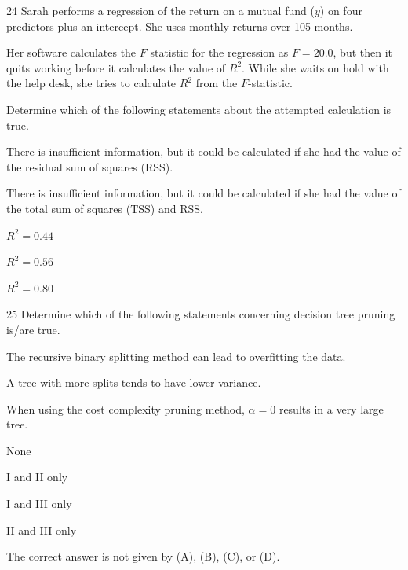 \begin{question}{24}
Sarah performs a regression of the return on a mutual fund ($y$) on four predictors plus an intercept. She uses monthly returns over 105 months.

Her software calculates the $F$ statistic for the regression as $F = 20.0$, but then it quits working before it calculates the value of $R^2$. While she waits on hold with the help desk, she tries to calculate $R^2$ from the $F$-statistic.

Determine which of the following statements about the attempted calculation is true.

\begin{choices}
\item There is insufficient information, but it could be calculated if she had the value of the residual sum of squares (RSS).
\item There is insufficient information, but it could be calculated if she had the value of the total sum of squares (TSS) and RSS.
\item $R^2 = 0.44$
\item $R^2 = 0.56$
\item $R^2 = 0.80$
\end{choices}
\end{question}

\begin{question}{25}
Determine which of the following statements concerning decision tree pruning is/are true.
\begin{statements}
\item The recursive binary splitting method can lead to overfitting the data.
\item A tree with more splits tends to have lower variance.
\item When using the cost complexity pruning method, $\alpha = 0$ results in a very large tree.
\end{statements}

\begin{choices}
\item None
\item I and II only
\item I and III only
\item II and III only
\item The correct answer is not given by (A), (B), (C), or (D).
\end{choices}
\end{question}

